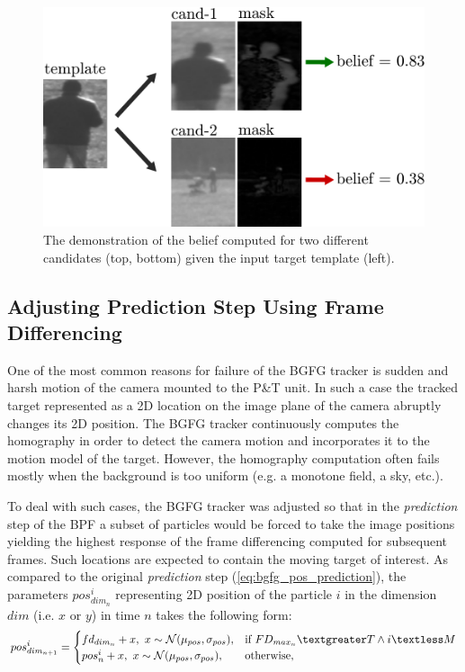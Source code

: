 \begin{figure}[htb]
	\centering
	\includegraphics[width=0.5\linewidth]{fig/belief.pdf}
	\caption{The demonstration of the belief computed for two different candidates (top, bottom) given the input target template (left).}
	\label{fig:belief}
\end{figure}

\subsection{Adjusting Prediction Step Using Frame Differencing} \label{txt:adjusting_prediction_step}

One of the most common reasons for failure of the BGFG tracker is sudden and harsh motion of the camera mounted to the P\&T unit. In such a case the tracked target represented as a 2D location on the image plane of the camera abruptly changes its 2D position. The BGFG tracker continuously computes the homography \cite{ObjectTrackinginMonochromaticVideo} in order to detect the camera motion and incorporates it to the motion model of the target. However, the homography computation often fails mostly when the background is too uniform (e.g. a monotone field, a sky, etc.).

To deal with such cases, the BGFG tracker was adjusted so that in the \textit{prediction} step of the BPF a subset of particles would be forced to take the image positions yielding the highest response of the frame differencing computed for subsequent frames. Such locations are expected to contain the moving target of interest. As compared to the original \textit{prediction} step (\ref{eq:bgfg_pos_prediction}), the parameters $pos_{dim_{n}}^{i}$ representing 2D position of the particle $i$ in the dimension $dim$ (i.e. $x$ or $y$) in time $n$ takes the following form:
\begin{align}
	pos_{dim_{n+1}}^{i} =
	\begin{cases}
		fd_{dim_{n}} + x, ~ x \sim \mathcal{N}(\mu_{pos}, \sigma_{pos}),  & \text{if}\ FD_{max_{n}} \textgreater T \land i \textless M \\
		pos_{n}^{i} + x, ~ x \sim \mathcal{N}(\mu_{pos}, \sigma_{pos}), & \text{otherwise},
	\end{cases}
\end{align}

